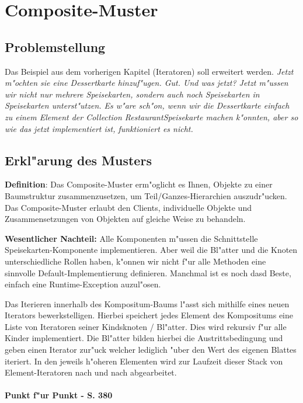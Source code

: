 \section{Composite-Muster}

\subsection{Problemstellung}
Das Beispiel aus dem vorherigen Kapitel (Iteratoren) soll erweitert werden. 
\emph{Jetzt m"ochten sie eine Dessertkarte hinzuf"ugen. Gut. Und was jetzt? Jetzt m"ussen wir nicht nur mehrere Speisekarten, sondern auch noch Speisekarten in Speisekarten unterst"utzen. Es w"are sch"on, wenn wir die Dessertkarte einfach zu einem Element der Collection RestaurantSpeisekarte machen k"onnten, aber so wie das jetzt implementiert ist, funktioniert es nicht.}

\subsection{Erkl"arung des Musters}
\textbf{Definition}: Das Composite-Muster erm"oglicht es Ihnen, Objekte zu einer Baumstruktur zusammenzusetzen, um Teil/Ganzes-Hierarchien auszudr"ucken. Das Composite-Muster erlaubt den Clients, individuelle Objekte und Zusammensetzungen von Objekten auf gleiche Weise zu behandeln. 

\textbf{Wesentlicher Nachteil:} Alle Komponenten m"ussen die Schnittstelle Speisekarten-Komponente implementieren. Aber weil die Bl"atter und die Knoten unterschiedliche Rollen haben, k"onnen wir nicht f"ur alle Methoden eine sinnvolle Default-Implementierung definieren. Manchmal ist es noch dasd Beste, einfach eine Runtime-Exception auzul"osen. 

Das Iterieren innerhalb des Kompositum-Baums l"asst sich mithilfe eines neuen Iterators bewerkstelligen. Hierbei speichert jedes Element des Kompositums eine Liste von Iteratoren seiner Kindsknoten / Bl"atter. Dies wird rekursiv f"ur alle Kinder implementiert. Die Bl"atter bilden hierbei die Austrittsbedingung und geben einen Iterator zur"uck welcher lediglich "uber den Wert des eigenen Blattes iteriert. In den jeweils h"oheren Elementen wird zur Laufzeit dieser Stack von Element-Iteratoren nach und nach abgearbeitet. 


\paragraph{Punkt f"ur Punkt - S. 380}

